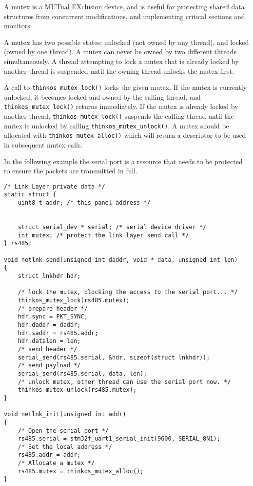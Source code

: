 A mutex is a MUTual EXclusion device, and is useful for protecting shared data structures from concurrent modifications, and implementing critical sections and monitors.

A mutex has two possible states: unlocked (not owned by any thread), and locked (owned by one thread). A mutex can never be owned by two different threads simultaneously. A thread attempting to lock a mutex that is already locked by another thread is suspended until the owning thread unlocks the mutex first.

A call to \lstinline{thinkos_mutex_lock()} locks the given mutex. If the mutex is currently unlocked, it becomes locked and owned by the calling thread, and \lstinline{thinkos_mutex_lock()} returns immediately. If the mutex is already locked by another thread, \lstinline{thinkos_mutex_lock()} suspends the calling thread until the mutex is unlocked by calling \lstinline{thinkos_mutex_unlock()}. A mutex should be allocated with \lstinline{thinkos_mutex_alloc()} which will return a descriptor to be used in subsequent mutex calls.

In the following example the serial port is a resource that needs to be protected to ensure the packets are transmitted in full.


\begin{lstlisting}[caption={Using MutExes examples},label={lst:example3},language=C99,frame=single]
/* Link Layer private data */
static struct {
	uint8_t addr; /* this panel address */
	
	
    struct serial_dev * serial; /* serial device driver */
    int mutex; /* protect the link layer send call */
} rs485;

void netlnk_send(unsigned int daddr, void * data, unsigned int len)
{
    struct lnkhdr hdr;

    /* lock the mutex, blocking the access to the serial port... */
    thinkos_mutex_lock(rs485.mutex);
    /* prepare header */
    hdr.sync = PKT_SYNC;
    hdr.daddr = daddr;
    hdr.saddr = rs485.addr;
    hdr.datalen = len;
    /* send header */
    serial_send(rs485.serial, &hdr, sizeof(struct lnkhdr));
    /* send payload */
    serial_send(rs485.serial, data, len);
    /* unlock mutex, other thread can use the serial port now. */
    thinkos_mutex_unlock(rs485.mutex);
}

void netlnk_init(unsigned int addr)
{
    /* Open the serial port */
    rs485.serial = stm32f_uart1_serial_init(9600, SERIAL_8N1);
    /* Set the local address */
    rs485.addr = addr;
    /* Allocate a mutex */
    rs485.mutex = thinkos_mutex_alloc();
}
\end{lstlisting}

